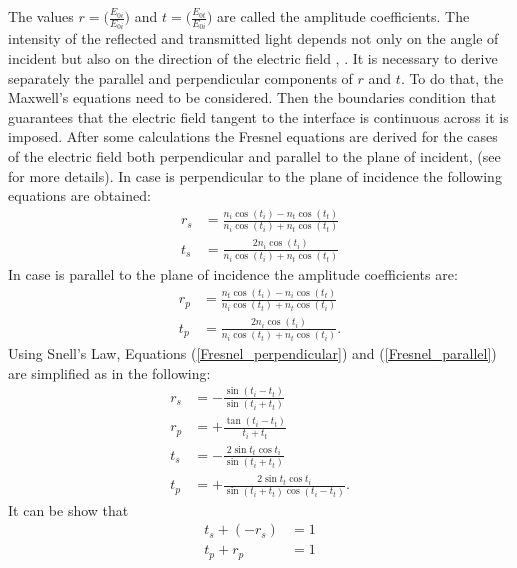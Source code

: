 The values $r = \Big(\frac{E_{0 i}}{E_{0 i}}\Big)$ and $t = \Big(\frac{E_{0 t}}{E_{0 i}}\Big)$ are called the amplitude coefficients.  
The intensity of the reflected and transmitted light depends not only on the angle of incident but also on the direction of the electric field , 
\cite{feynman1964feynman}.
It is necessary to derive separately the parallel and perpendicular components of $r$ and $t$. 
To do that, the Maxwell's equations need to be considered. 
Then the boundaries condition that guarantees that the electric field  tangent to the interface is continuous across it is imposed. 
After some calculations the Fresnel equations are derived for the cases of the electric field both perpendicular and parallel to the plane of incident, (see  \cite{born2013principles, hecht1998hecht} for more details). In case  is perpendicular to the plane of incidence the following equations are obtained:
\begin{equation} \label{Fresnel_perpendicular}
\begin{split}
r_{s} & = \frac{n_i\cos(t_i)-n_t \cos(t_t)}{n_i \cos(t_i)+n_t\cos(t_t)}\\
t_{s} & =  \frac{2n_i\cos(t_i)}{n_i\cos(t_i)+n_t\cos(t_t)}
\end{split}
\end{equation}
In case  is parallel to the plane of incidence the amplitude coefficients are:
\begin{equation}\label{Fresnel_parallel}
\begin{split}
r_{p} & = \frac{n_t\cos(t_i)-n_i \cos(t_t)}{n_i \cos(t_t)+n_t\cos(t_i)}\\
t_{p} & =  \frac{2n_i\cos(t_i)}{n_i\cos(t_t)+n_t\cos(t_i)}.
\end{split}
\end{equation}
Using Snell's Law,  Equations (\ref{Fresnel_perpendicular}) and (\ref{Fresnel_parallel}) are simplified as in the following:
\begin{equation} \label{simple_Fresnel}
\begin{split}
r_{s} & = -\frac{\sin(t_i-t_t)}{\sin(t_i+t_t)}\\
r_{p} & =  +\frac{\tan(t_i-t_t)}{t_i+t_t}\\
t_{s} & = -\frac{2\sin t_t \cos t_i}{\sin(t_i+t_t)}\\
t_{p} & = +\frac{2\sin t_t \cos t_i}{\sin(t_i+t_t)\cos(t_i- t_t)}.
\end{split}
\end{equation}
It can be show that
 \begin{equation}
\begin{split}
t_s+(-r_s) &= 1 \\
t_p+r_p &=  1
\end{split}
\end{equation}
